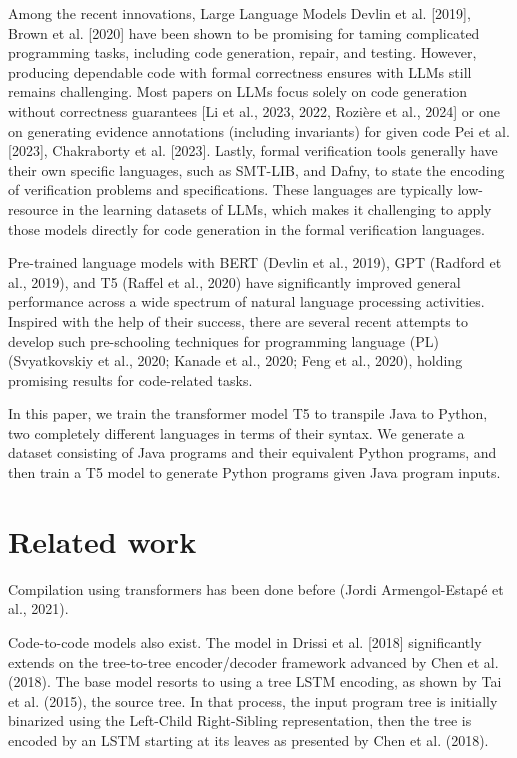 \documentclass{dhbenelux}
\begin{document}
Among the recent innovations, Large Language Models Devlin et al. [2019], Brown et al. [2020] have been shown to be promising for taming complicated programming tasks, including code generation, repair, and testing. However, producing dependable code with formal correctness ensures with LLMs still remains challenging. Most papers on LLMs focus solely on code generation without correctness guarantees [Li et al., 2023, 2022, Rozière et al., 2024] or one on generating evidence annotations (including invariants) for given code Pei et al. [2023], Chakraborty et al. [2023]. Lastly, formal verification tools generally have their own specific languages, such as SMT-LIB, and Dafny, to state the encoding of verification problems and specifications. These languages are typically low-resource in the learning datasets of LLMs, which makes it challenging to apply those models directly for code generation in the formal verification languages. 

Pre-trained language models with BERT (Devlin et al., 2019), GPT (Radford et al., 2019), and T5 (Raffel et al., 2020) have significantly improved general performance across a wide spectrum of natural language processing activities. Inspired with the help of their success, there are several recent attempts to develop such pre-schooling techniques for programming language (PL) (Svyatkovskiy et al., 2020; Kanade et al., 2020; Feng et al., 2020), holding promising results for code-related tasks.

In this paper, we train the transformer model T5 to transpile Java to Python, two completely different languages in terms of their syntax. We generate a dataset consisting of Java programs and their equivalent Python programs, and then train a T5 model to generate Python programs given Java program inputs. 


\section{Related work}

Compilation using transformers has been done before (Jordi Armengol-Estapé et al., 2021). 

Code-to-code models also exist. The model in Drissi et al. [2018] significantly extends on the tree-to-tree encoder/decoder framework advanced by Chen et al. (2018). The base model resorts to using a tree LSTM encoding, as shown by Tai et al. (2015), the source tree. In that process, the input program tree is initially binarized using the Left-Child Right-Sibling representation, then the tree is encoded by an LSTM starting at its leaves as presented by Chen et al. (2018).  
\end{document}
